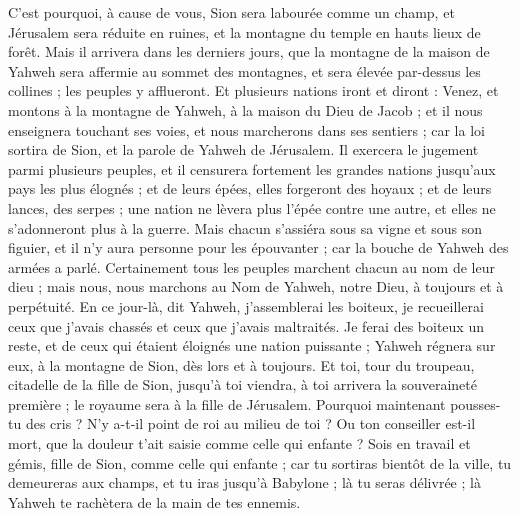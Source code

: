 \begin{multicols}{2}
C'est pourquoi, à cause de vous, Sion sera labourée comme un champ, et Jérusalem sera réduite en ruines, et la montagne du temple en hauts lieux de forêt.
\VerseOne{}Mais il arrivera dans les derniers jours, que la montagne de la maison de Yahweh sera affermie au sommet des montagnes, et sera élevée par-dessus les collines ; les peuples y afflueront.
Et plusieurs nations iront et diront : Venez, et montons à la montagne de Yahweh, à la maison du Dieu de Jacob ; et il nous enseignera touchant ses voies, et nous marcherons dans ses sentiers ; car la loi sortira de Sion, et la parole de Yahweh de Jérusalem.
Il exercera le jugement parmi plusieurs peuples, et il censurera fortement les grandes nations jusqu'aux pays les plus élognés ; et de leurs épées, elles forgeront des hoyaux ; et de leurs lances, des serpes ; une nation ne lèvera plus l'épée contre une autre, et elles ne s'adonneront plus à la guerre.
Mais chacun s'assiéra sous sa vigne et sous son figuier, et il n'y aura personne pour les épouvanter ; car la bouche de Yahweh des armées a parlé.
Certainement tous les peuples marchent chacun au nom de leur dieu ; mais nous, nous marchons au Nom de Yahweh, notre Dieu, à toujours et à perpétuité.
En ce jour-là, dit Yahweh, j'assemblerai les boiteux, je recueillerai ceux que j'avais chassés et ceux que j'avais maltraités.
Je ferai des boiteux un reste, et de ceux qui étaient éloignés une nation puissante ; Yahweh régnera sur eux, à la montagne de Sion, dès lors et à toujours.
Et toi, tour du troupeau, citadelle de la fille de Sion, jusqu'à toi viendra, à toi arrivera la souveraineté première ; le royaume sera à la fille de Jérusalem.
Pourquoi maintenant pousses-tu des cris ? N'y a-t-il point de roi au milieu de toi ? Ou ton conseiller est-il mort, que la douleur t'ait saisie comme celle qui enfante ?
Sois en travail et gémis, fille de Sion, comme celle qui enfante ; car tu sortiras bientôt de la ville, tu demeureras aux champs, et tu iras jusqu'à Babylone ; là tu seras délivrée ; là Yahweh te rachètera de la main de tes ennemis.

\end{multicols}
